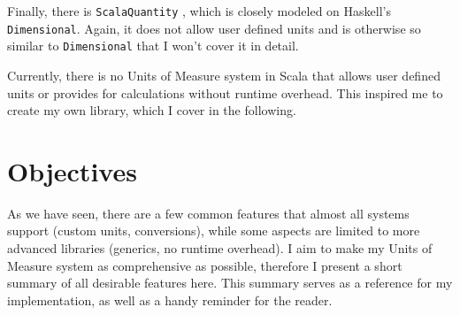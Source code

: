 \documentclass[12pt,oneside,a4paper]{scrbook}
\begin{document}
Finally, there is \verb/ScalaQuantity/ \citep{Hans12}, which is closely modeled on Haskell's \verb/Dimensional/. Again, it does not allow user defined units and is otherwise so similar to \verb/Dimensional/ that I won't cover it in detail.

Currently, there is no Units of Measure system in Scala that allows user defined units or provides for calculations without runtime overhead. This inspired me to create my own library, which I cover in the following.

\chapter{Objectives}

As we have seen, there are a few common features that almost all systems support (custom units, conversions), while some aspects are limited to more advanced libraries (generics, no runtime overhead). I aim to make my Units of Measure system as comprehensive as possible, therefore I present a short summary of all desirable features here. This summary serves as a reference for my implementation, as well as a handy reminder for the reader.
\end{document}
